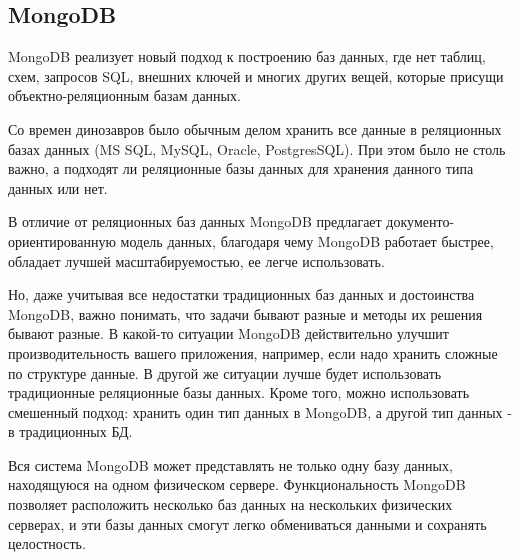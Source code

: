 \subsection{MongoDB}

MongoDB реализует новый подход к построению баз данных, где нет таблиц, схем, запросов SQL, внешних ключей и многих других вещей, которые присущи объектно-реляционным базам данных.

Со времен динозавров было обычным делом хранить все данные в реляционных базах данных (MS SQL, MySQL, Oracle, PostgresSQL). При этом было не столь важно, а подходят ли реляционные базы данных для хранения данного типа данных или нет.

В отличие от реляционных баз данных MongoDB предлагает документо-ориентированную модель данных, благодаря чему MongoDB работает быстрее, обладает лучшей масштабируемостью, ее легче использовать.

Но, даже учитывая все недостатки традиционных баз данных и достоинства MongoDB, важно понимать, что задачи бывают разные и методы их решения бывают разные. В какой-то ситуации MongoDB действительно улучшит производительность вашего приложения, например, если надо хранить сложные по структуре данные. В другой же ситуации лучше будет использовать традиционные реляционные базы данных. Кроме того, можно использовать смешенный подход: хранить один тип данных в MongoDB, а другой тип данных - в традиционных БД.

Вся система MongoDB может представлять не только одну базу данных, находящуюся на одном физическом сервере. Функциональность MongoDB позволяет расположить несколько баз данных на нескольких физических серверах, и эти базы данных смогут легко обмениваться данными и сохранять целостность.